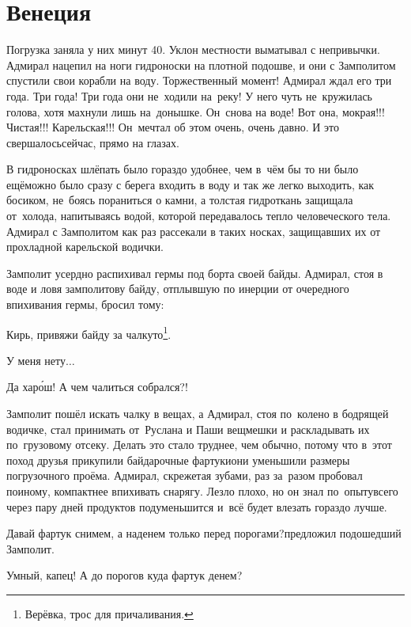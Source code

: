 \chapter{Венеция}
\vepsianrose

Погрузка заняла у них минут 40. Уклон местности выматывал с непривычки. Адмирал нацепил на ноги гидроноски на плотной подошве, и они с Замполитом спустили свои корабли на воду. Торжественный момент! Адмирал ждал его три года. Три года! Три года они не~ходили на~реку! У него чуть не~кружилась голова, хотя махнули лишь на~донышке. Он~снова на воде! Вот она, мокрая!!! Чистая!!! Карельская!!! Он~мечтал об этом очень, очень давно. И это свершалось\mdash сейчас, прямо на глазах.

В гидроносках шлёпать было гораздо удобнее, чем в~чём бы то ни было ещё\mdash можно было сразу с берега входить в воду и так же легко выходить, как босиком, не~боясь пораниться о камни, а толстая гидроткань защищала от~холода, напитываясь водой, которой передавалось тепло человеческого тела. Адмирал с Замполитом как раз рассекали в таких носках, защищавших их от прохладной карельской водички.

Замполит усердно распихивал гермы под борта своей байды. Адмирал, стоя в воде и ловя замполитову байду, отплывшую по инерции от очередного впихивания гермы, бросил тому:

\renewcommand*{\thefootnote}{\fnsymbol{footnote}}
\setcounter{footnote}{0}
\diagdash Кирь, привяжи байду за чалку\sdash то\footnote{Верёвка, трос для причаливания.}.

\diagdash У меня нету$\ldots$

\diagdash Да хар\'{о}ш! А чем чалиться собрался?!

Замполит пошёл искать чалку в вещах, а Адмирал, стоя по~колено в бодрящей водичке, стал принимать от~Руслана и Паши вещмешки и раскладывать их по~грузовому отсеку. Делать это стало труднее, чем обычно, потому что в~этот поход друзья прикупили байдарочные фартуки\mdash они уменьшили размеры погрузочного проёма. Адмирал, скрежетая зубами, раз за~разом пробовал по\sdash иному, компактнее впихивать снарягу. Лезло плохо, но он знал по~опыту\mdash всего через пару дней продуктов подуменьшится и~всё будет влезать гораздо лучше.

\diagdash Давай фартук снимем, а наденем только перед порогами?\mdash предложил подошедший Замполит. 

\diagdash Умный, капец! А до порогов куда фартук денем? 

